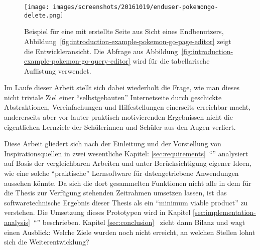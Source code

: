 \begin{figure}[p]
  \texttt{[image: images/screenshots/20161019/enduser-pokemongo-delete.png]}
  \caption{Beispiel für eine mit \idename{} erstellte Seite aus Sicht eines Endbenutzers,  Abbildung~\ref{fig:introduction-example-pokemon-go-page-editor} zeigt die Entwickleransicht. Die Abfrage aus Abbildung~\ref{fig:introduction-example-pokemon-go-query-editor} wird für die tabellarische Auflistung verwendet.}
  \label{fig:introduction-example-pokemon-go-catch}
\end{figure}

Im Laufe dieser Arbeit stellt sich dabei wiederholt die Frage, wie man dieses nicht triviale Ziel einer "`selbstgebauten"' Internetseite durch geschickte Abstraktionen, Vereinfachungen und Hilfestellungen einerseits erreichbar macht, andererseits aber vor lauter praktisch motivierenden Ergebnissen nicht die eigentlichen Lernziele der Schülerinnen und Schüler aus den Augen verliert.

Diese Arbeit gliedert sich nach der Einleitung und der Vorstellung von Inspirationsquellen in zwei wesentliche Kapitel: \ref{sec:requirements}~"`"' analysiert auf Basis der vergleichbaren Arbeiten und unter Berücksichtigung eigener Ideen, wie eine solche "`praktische"' Lernsoftware für datengetriebene Anwendungen aussehen könnte. Da sich die dort gesammelten Funktionen nicht alle in dem für die Thesis zur Verfügung stehenden Zeitrahmen umsetzen lassen, ist das softwaretechnische Ergebnis dieser Thesis als ein "`minimum viable product"' zu verstehen. Die Umsetzung dieses Prototypen wird in Kapitel \ref{sec:implementation-analysis}~"`"' beschrieben. Kapitel \ref{sec:conclusion}~ zieht dann Bilanz und wagt einen Ausblick: Welche Ziele wurden noch nicht erreicht, an welchen Stellen lohnt sich die Weiterentwicklung?

